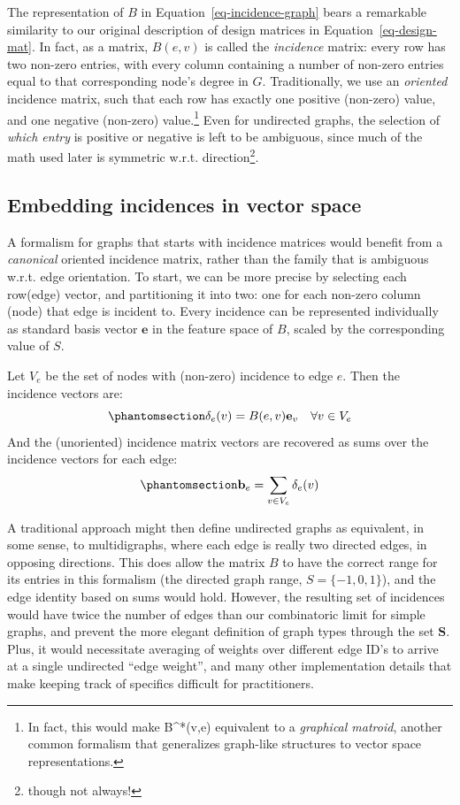 \documentclass[%
	12pt,
		oneside,
		letterpaper
]{book}
\begin{document}
The representation of \(B\) in Equation~\ref{eq-incidence-graph} bears a
remarkable similarity to our original description of design matrices in
Equation~\ref{eq-design-mat}. In fact, as a matrix, \(B(e,v)\) is called
the \emph{incidence} matrix: every row has two non-zero entries, with
every column containing a number of non-zero entries equal to that
corresponding node's degree in \(G\). Traditionally, we use an
\emph{oriented} incidence matrix, such that each row has exactly one
positive (non-zero) value, and one negative (non-zero) value.\footnote{
  In fact, this would make B\^{}*(v,e) equivalent to a \emph{graphical
  matroid}, another common formalism that generalizes graph-like
  structures to vector space representations.} Even for undirected
graphs, the selection of \emph{which entry} is positive or negative is
left to be ambiguous, since much of the math used later is symmetric
w.r.t. direction\footnote{though not always!}.

\subsection{Embedding incidences in vector
space}\label{embedding-incidences-in-vector-space}

A formalism for graphs that starts with incidence matrices would benefit
from a \emph{canonical} oriented incidence matrix, rather than the
family that is ambiguous w.r.t. edge orientation. To start, we can be
more precise by selecting each row(edge) vector, and partitioning it
into two: one for each non-zero column (node) that edge is incident to.
Every incidence can be represented individually as standard basis vector
\(\mathbf{e}\) in the feature space of \(B\), scaled by the
corresponding value of \(S\).

Let \(V_e\) be the set of nodes with (non-zero) incidence to edge \(e\).
Then the incidence vectors are:\\
\begin{equation}\phantomsection\label{eq-incidence-vec}{
\delta_e(v) = B(e,v)\mathbf{e}_v \quad \forall v\in V_e
}\end{equation} And the (unoriented) incidence matrix vectors are
recovered as sums over the incidence vectors for each edge:
\begin{equation}\phantomsection\label{eq-incidence-edge-sum}{
\mathbf{b}_e = \sum_{v\in V_e} \delta_e(v)
}\end{equation}

A traditional approach might then define undirected graphs as
equivalent, in some sense, to multidigraphs, where each edge is really
two directed edges, in opposing directions. This does allow the matrix
\(B\) to have the correct range for its entries in this formalism (the
directed graph range, \(S=\{-1,0,1\}\)), and the edge identity based on
sums would hold. However, the resulting set of incidences would have
twice the number of edges than our combinatoric limit for simple graphs,
and prevent the more elegant definition of graph types through the set
\(\mathbf{S}\). Plus, it would necessitate averaging of weights over
different edge ID's to arrive at a single undirected ``edge weight'',
and many other implementation details that make keeping track of
specifics difficult for practitioners.
\end{document}
